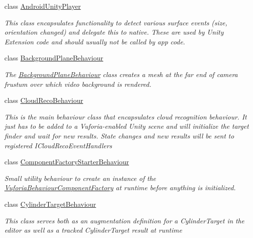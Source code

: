 \begin{DoxyCompactItemize}
\item 
class \hyperlink{class_vuforia_1_1_android_unity_player}{Android\+Unity\+Player}
\begin{DoxyCompactList}\small\item\em This class encapsulates functionality to detect various surface events (size, orientation changed) and delegate this to native. These are used by Unity Extension code and should usually not be called by app code. \end{DoxyCompactList}\item 
class \hyperlink{class_vuforia_1_1_background_plane_behaviour}{Background\+Plane\+Behaviour}
\begin{DoxyCompactList}\small\item\em The \hyperlink{class_vuforia_1_1_background_plane_behaviour}{Background\+Plane\+Behaviour} class creates a mesh at the far end of camera frustum over which video background is rendered. \end{DoxyCompactList}\item 
class \hyperlink{class_vuforia_1_1_cloud_reco_behaviour}{Cloud\+Reco\+Behaviour}
\begin{DoxyCompactList}\small\item\em This is the main behaviour class that encapsulates cloud recognition behaviour. It just has to be added to a Vuforia-\/enabled Unity scene and will initialize the target finder and wait for new results. State changes and new results will be sent to registered I\+Cloud\+Reco\+Event\+Handlers \end{DoxyCompactList}\item 
class \hyperlink{class_vuforia_1_1_component_factory_starter_behaviour}{Component\+Factory\+Starter\+Behaviour}
\begin{DoxyCompactList}\small\item\em Small utility behaviour to create an instance of the \hyperlink{class_vuforia_1_1_vuforia_behaviour_component_factory}{Vuforia\+Behaviour\+Component\+Factory} at runtime before anything is initialized. \end{DoxyCompactList}\item 
class \hyperlink{class_vuforia_1_1_cylinder_target_behaviour}{Cylinder\+Target\+Behaviour}
\begin{DoxyCompactList}\small\item\em This class serves both as an augmentation definition for a Cylinder\+Target in the editor as well as a tracked Cylinder\+Target result at runtime \end{DoxyCompactList}\item 

\end{DoxyCompactItemize}
